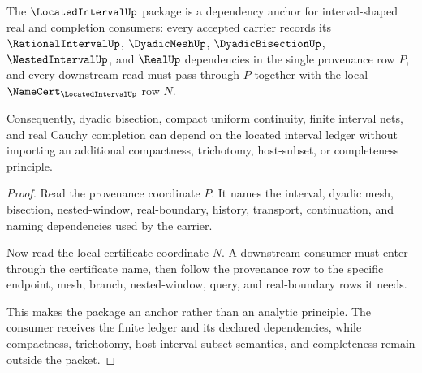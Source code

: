 \begin{theorem}
\label{thm:locatedinterval-dependency-anchor-package}
The $\LocatedIntervalUp$ package is a dependency anchor for interval-shaped real and completion consumers: every accepted carrier records its $\RationalIntervalUp$, $\DyadicMeshUp$, $\DyadicBisectionUp$, $\NestedIntervalUp$, and $\RealUp$ dependencies in the single provenance row $P$, and every downstream read must pass through $P$ together with the local $\NameCert_{\LocatedIntervalUp}$ row $N$.

Consequently, dyadic bisection, compact uniform continuity, finite interval nets, and real Cauchy completion can depend on the located interval ledger without importing an additional compactness, trichotomy, host-subset, or completeness principle.
\end{theorem}
\begin{proof}
Read the provenance coordinate $P$. It names the interval, dyadic mesh, bisection, nested-window, real-boundary, history, transport, continuation, and naming dependencies used by the carrier.

Now read the local certificate coordinate $N$. A downstream consumer must enter through the certificate name, then follow the provenance row to the specific endpoint, mesh, branch, nested-window, query, and real-boundary rows it needs.

This makes the package an anchor rather than an analytic principle. The consumer receives the finite ledger and its declared dependencies, while compactness, trichotomy, host interval-subset semantics, and completeness remain outside the packet.
\end{proof}


\begin{closurestatus}{\LocatedIntervalUp}
  \theoryclosure{\seedClosure}
  \formalstatus{\unformalizedV}
\end{closurestatus}
